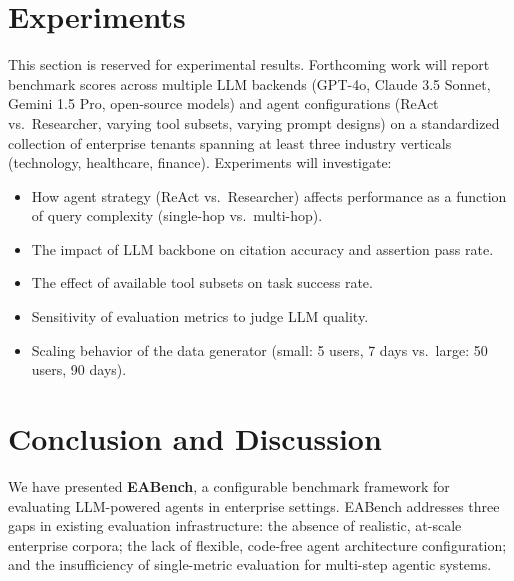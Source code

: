 \documentclass[10pt,twocolumn]{article}
\begin{document}
\section{Experiments}
\label{sec:experiments}

This section is reserved for experimental results.  Forthcoming work will
report benchmark scores across multiple LLM backends (GPT-4o, Claude 3.5
Sonnet, Gemini 1.5 Pro, open-source models) and agent configurations (ReAct
vs.\ Researcher, varying tool subsets, varying prompt designs) on a
standardized collection of enterprise tenants spanning at least three industry
verticals (technology, healthcare, finance).  Experiments will investigate:

\begin{itemize}[leftmargin=*,itemsep=2pt]
  \item How agent strategy (ReAct vs.\ Researcher) affects performance as a
    function of query complexity (single-hop vs.\ multi-hop).
  \item The impact of LLM backbone on citation accuracy and assertion pass
    rate.
  \item The effect of available tool subsets on task success rate.
  \item Sensitivity of evaluation metrics to judge LLM quality.
  \item Scaling behavior of the data generator (small: 5 users, 7 days vs.\
    large: 50 users, 90 days).
\end{itemize}

\section{Conclusion and Discussion}
\label{sec:conclusion}

We have presented \textbf{EABench}, a configurable benchmark framework for
evaluating LLM-powered agents in enterprise settings.  EABench addresses three
gaps in existing evaluation infrastructure: the absence of realistic, at-scale
enterprise corpora; the lack of flexible, code-free agent architecture
configuration; and the insufficiency of single-metric evaluation for multi-step
agentic systems.
\end{document}

